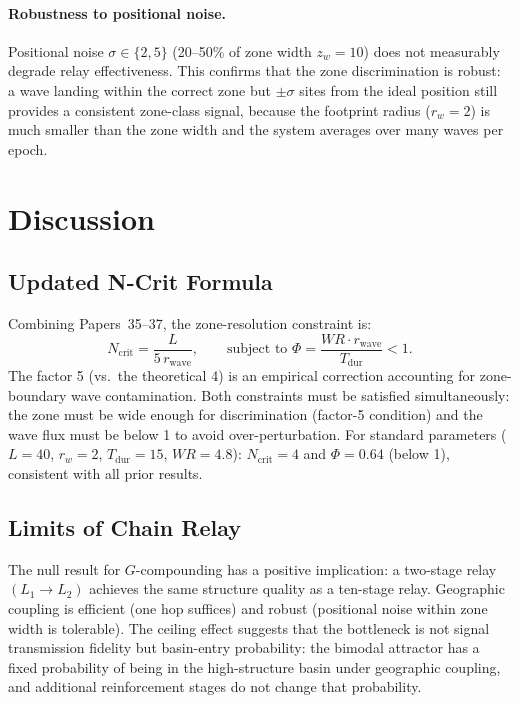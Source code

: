 \documentclass[11pt]{article}
\begin{document}
\paragraph{Robustness to positional noise.}
Positional noise $\sigma \in \{2, 5\}$ (20--50\% of zone width $z_w = 10$)
does not measurably degrade relay effectiveness.
This confirms that the zone discrimination is robust: a wave landing within
the correct zone but $\pm\sigma$ sites from the ideal position still provides
a consistent zone-class signal, because the footprint radius ($r_w = 2$) is
much smaller than the zone width and the system averages over many waves per
epoch.

\section{Discussion}

\subsection{Updated N-Crit Formula}

Combining Papers~35--37, the zone-resolution constraint is:
\begin{equation}
  N_\mathrm{crit} = \frac{L}{5\, r_\mathrm{wave}},
  \qquad \text{subject to } \Phi = \frac{WR \cdot r_\mathrm{wave}}{T_\mathrm{dur}} < 1.
\end{equation}
The factor 5 (vs.\ the theoretical 4) is an empirical correction accounting
for zone-boundary wave contamination.
Both constraints must be satisfied simultaneously: the zone must be wide enough
for discrimination (factor-5 condition) and the wave flux must be below 1
to avoid over-perturbation.
For standard parameters ($L=40$, $r_w=2$, $T_\mathrm{dur}=15$, $WR=4.8$):
$N_\mathrm{crit} = 4$ and $\Phi = 0.64$ (below 1), consistent with all prior results.

\subsection{Limits of Chain Relay}

The null result for $G$-compounding has a positive implication: a two-stage
relay $(L_1 \to L_2)$ achieves the same structure quality as a ten-stage relay.
Geographic coupling is efficient (one hop suffices) and robust (positional
noise within zone width is tolerable).
The ceiling effect suggests that the bottleneck is not signal transmission
fidelity but basin-entry probability: the bimodal attractor has a fixed
probability of being in the high-structure basin under geographic coupling,
and additional reinforcement stages do not change that probability.
\end{document}
